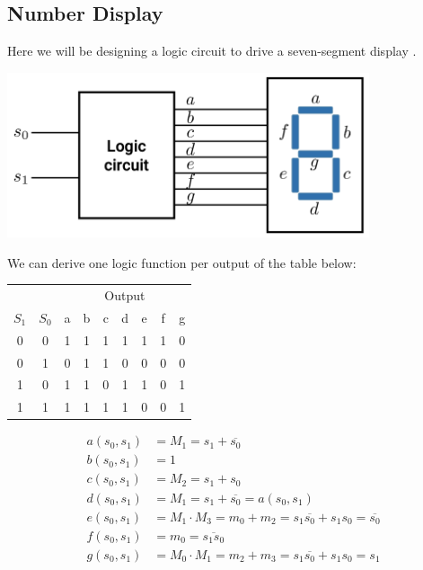 \documentclass[12pt,openany, tikz,border=10pt]{book}
\begin{document}
\subsection{Number Display}
Here we will be designing a logic circuit to drive a seven-segment display .
\begin{center}
    \begin{minipage}[c]{0.80\textwidth} %
        \centering
        \includegraphics[width=0.80\textwidth]{circuits/6.12.1.png} 
    \end{minipage}
\end{center}
We can derive one logic function per output of the table below:
\begin{table}[h!]
    \centering
    \begin{tabular}{|c|c|c|c|c|c|c|c|c|}
      \hline
      \multicolumn{2}{|c|}{} & \multicolumn{7}{c|}{Output} \\
      \hhline{|~|-|-------|}
      \( S_1 \) & \( S_0 \) & a & b & c & d & e & f & g \\
      \hline
      0 & 0 & 1 & 1 & 1 & 1 & 1 & 1 & 0 \\
      \hline
      0 & 1 & 0 & 1 & 1 & 0 & 0 & 0 & 0 \\
      \hline
      1 & 0 & 1 & 1 & 0 & 1 & 1 & 0 & 1 \\
      \hline
      1 & 1 & 1 & 1 & 1 & 1 & 0 & 0 & 1 \\
      \hline
    \end{tabular}
  \end{table}
\vspace{-10px}
  \begin{align*}
    a(s_0, s_1) &= M_1 = s_1 + \overline{s_0} \\
    b(s_0, s_1) &= 1 \\
    c(s_0, s_1) &= M_2 = s_1 + s_0 \\
    d(s_0, s_1) &= M_1 = s_1 + \overline{s_0} = a(s_0, s_1) \\
    e(s_0, s_1) &= M_1 \cdot M_3 = m_0 + m_2 = s_1 \overline{s_0} + s_1s_0 = \overline{s_0} \\
    f(s_0, s_1) &= m_0 = \overline{s_1 s_0} \\
    g(s_0, s_1) &= M_0 \cdot M_1 = m_2 + m_3 = s_1 \overline{s_0} + s_1s_0 = s_1
    \end{align*}
\end{document}
